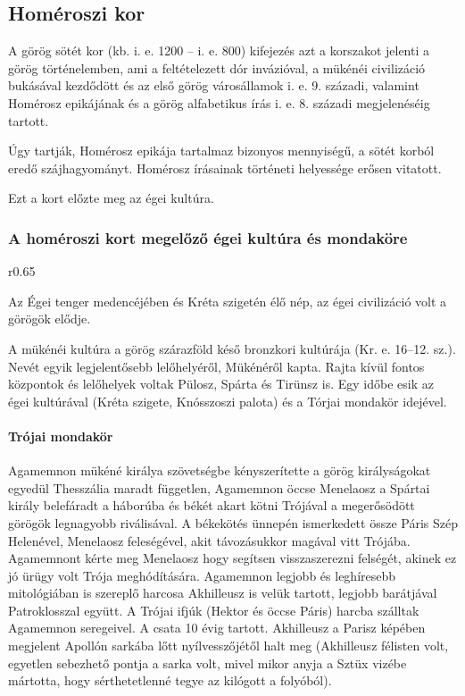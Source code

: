 \clearpage

\subsection*{Homéroszi kor}

A görög sötét kor (kb. i. e. 1200 – i. e. 800) kifejezés azt a korszakot jelenti a görög történelemben, ami a feltételezett dór invázióval, a mükénéi civilizáció bukásával kezdődött és az első görög városállamok i. e. 9. századi, valamint Homérosz epikájának és a görög alfabetikus írás i. e. 8. századi megjelenéséig tartott.

Úgy tartják, Homérosz epikája tartalmaz bizonyos mennyiségű, a sötét korból eredő szájhagyományt. Homérosz írásainak történeti helyessége erősen vitatott.

Ezt a kort előzte meg az égei kultúra.

\subsubsection{A homéroszi kort megelőző égei kultúra és mondaköre}

\begin{wrapfigure}{r}{0.65\textwidth}
\end{wrapfigure}
Az Égei tenger medencéjében és Kréta szigetén élő nép, az égei civilizáció volt a görögök elődje.

A mükénéi kultúra a görög szárazföld késő bronzkori kultúrája (Kr. e. 16–12. sz.). Nevét egyik legjelentősebb lelőhelyéről, Mükénéről kapta. Rajta kívül fontos központok és lelőhelyek voltak Pülosz, Spárta és Tirünsz is. Egy időbe esik az égei kultúrával (Kréta szigete, Knósszoszi palota) és a Tórjai mondakör idejével.

\paragraph{Trójai mondakör}
Agamemnon mükéné királya szövetségbe kényszerítette a görög királyságokat egyedül Thesszália maradt független, Agamemnon öccse Menelaosz a Spártai király belefáradt a háborúba és békét akart kötni Trójával a megerősödött görögök legnagyobb riválisával. A békekötés ünnepén ismerkedett össze Páris Szép Helenével, Menelaosz feleségével, akit távozásukkor magával vitt Trójába. Agamemnont kérte meg Menelaosz hogy segítsen visszaszerezni felségét, akinek ez jó ürügy volt Trója meghódítására. Agamemnon legjobb és leghíresebb mitológiában is szereplő harcosa Akhilleusz is velük tartott, legjobb barátjával Patroklosszal együtt. A Trójai ifjúk (Hektor és öccse Páris) harcba szálltak Agamemnon seregeivel. A csata 10 évig tartott. Akhilleusz a Parisz képében megjelent Apollón sarkába lőtt nyílvesszőjétől halt meg (Akhilleusz félisten volt, egyetlen sebezhető pontja a sarka volt, mivel mikor anyja a Sztüx vizébe mártotta, hogy sérthetetlenné tegye az kilógott a folyóból).


